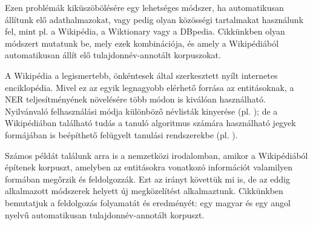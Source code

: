 \documentclass{llncs}
\begin{document}
Ezen problémák kiküszöbölésére egy lehetséges módszer, ha automatikusan állítunk elő  
adathalmazokat, vagy pedig olyan közösségi tartalmakat használunk fel, mint pl. a
Wikipédia, a Wiktionary vagy a DBpedia. Cikkünkben olyan módszert mutatunk be, mely ezek
kombinációja, és amely a Wikipédiából automatikusan állít elő tulajdonnév-annotált
korpuszokat.




A Wikipédia a legismertebb, önkéntesek által szerkesztett nyílt internetes
enciklopédia. Mivel ez az egyik
legnagyobb elérhető forrása az entitásoknak, a NER teljesítményének növelésére több
módon is kiválóan használható. Nyilvánvaló felhasználási
módja különböző névlisták kinyerése (pl. \cite{Toral_2006.a}); de a Wikipédiában található
tudás a tanuló algoritmus számára használható jegyek formájában is beépíthető felügyelt
tanulási rendszerekbe (pl. \cite{KaTo07}). 

Számos példát találunk arra is a nemzetközi irodalomban, amikor a Wikipédiából építenek
korpuszt, amelyben az entitásokra vonatkozó információt valamilyen formában megőrzik és
feldolgozzák. Ezt az irányt követtük mi is, de az eddig alkalmazott módszerek
helyett új megközelítést alkalmaztunk. Cikkünkben bemutatjuk a feldolgozás
folyamatát és eredményét: egy magyar és egy angol nyelvű automatikusan
tulajdonnév-annotált korpuszt.
\end{document}
